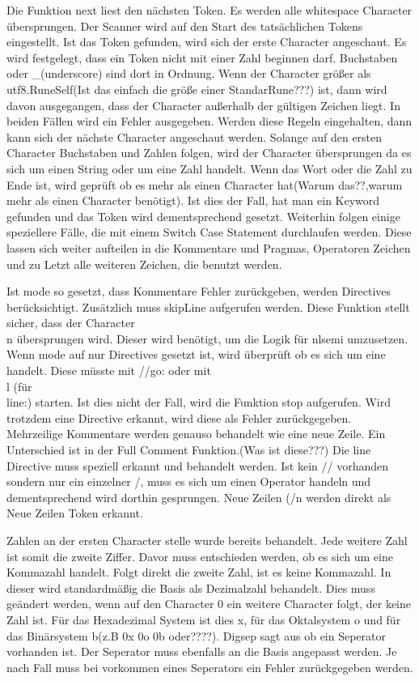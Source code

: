 Die Funktion next liest den nächsten Token. Es werden alle whitespace Character übersprungen. Der Scanner wird auf den Start des tatsächlichen Tokens eingestellt. Ist das Token gefunden, wird sich der erste Character angeschaut. 
Es wird festgelegt, dass ein Token nicht mit einer Zahl beginnen darf. Buchstaben oder \_(underscore) sind dort in Ordnung. Wenn der Character größer als utf8.RuneSelf(Ist das einfach die größe einer StandarRune???) ist, dann wird davon ausgegangen, dass der Character außerhalb der gültigen Zeichen liegt. In beiden Fällen wird ein Fehler ausgegeben. Werden diese Regeln eingehalten, dann kann sich der nächste Character angeschaut werden.
Solange auf den ersten Character Buchstaben und Zahlen folgen, wird der Character übersprungen da es sich um einen String oder um eine Zahl handelt.
Wenn das Wort oder die Zahl zu Ende ist, wird geprüft ob es mehr als einen Character hat(Warum das??,warum mehr als einen Character benötigt). Ist dies der Fall, hat man ein Keyword gefunden und das Token wird dementsprechend gesetzt.
Weiterhin folgen einige speziellere Fälle, die mit einem Switch Case Statement durchlaufen werden. Diese lassen sich weiter aufteilen in die Kommentare und Pragmas, Operatoren Zeichen und zu Letzt alle weiteren Zeichen, die benutzt werden.  

Ist mode so gesetzt, dass Kommentare Fehler zurückgeben, werden Directives berücksichtigt. Zusätzlich muss skipLine aufgerufen werden. Diese Funktion stellt sicher, dass der Character \\n übersprungen wird. Dieser wird benötigt, um die Logik für nlsemi umzusetzen. Wenn mode auf nur Directives gesetzt ist, wird überprüft ob es sich um eine handelt. Diese müsste mit //go: oder mit \\l (für \\line:) starten. Ist dies nicht der Fall, wird die Funktion stop aufgerufen. Wird trotzdem eine Directive erkannt, wird diese als Fehler zurückgegeben.\\
Mehrzeilige Kommentare werden genauso behandelt wie eine neue Zeile. Ein Unterschied ist in der Full Comment Funktion.(Was ist diese???)
Die line Directive muss speziell erkannt und behandelt werden.
Ist kein // vorhanden sondern nur ein einzelner /, muss es sich um einen Operator handeln und dementsprechend wird dorthin gesprungen. Neue Zeilen (/n werden direkt als Neue Zeilen Token erkannt.

Zahlen an der ersten Character stelle wurde bereits behandelt. Jede weitere Zahl ist somit die zweite Ziffer. Davor muss entschieden werden, ob es sich um eine Kommazahl handelt.
Folgt direkt die zweite Zahl, ist es keine Kommazahl. In dieser wird standardmäßig die Basis als Dezimalzahl behandelt. Dies muss geändert werden, wenn auf den Character 0 ein weitere Character folgt, der keine Zahl ist. Für das Hexadezimal System ist dies x, für das Oktalsystem o und für das Binärsystem b(z.B 0x 0o 0b oder????). Digsep sagt aus ob ein Seperator vorhanden ist. 
Der Seperator muss ebenfalls an die Basis angepasst werden. Je nach Fall muss bei vorkommen eines Seperators ein Fehler zurückgegeben werden.


